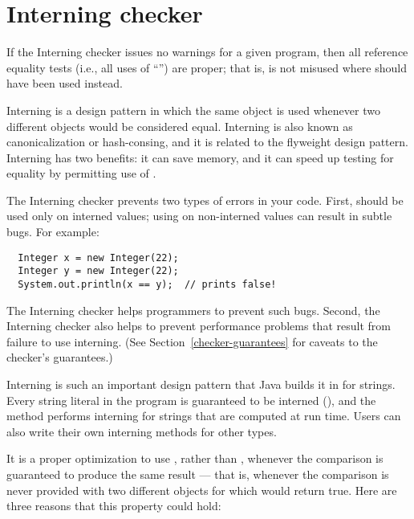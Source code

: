 \htmlhr
\chapter{Interning checker\label{interning-checker}}

If the Interning checker issues no warnings for a given program, then all
reference equality tests (i.e., all uses of ``\code{==}'') are proper;
that is,
\code{==} is not misused where  should have been used instead.

Interning is a design pattern in which the same object is used whenever two
different objects would be considered equal.  Interning is also known as
canonicalization or hash-consing, and it is related to the flyweight design
pattern.
Interning has two benefits:  it can save memory, and it can speed up testing for
equality by permitting use of \code{==}.

The Interning checker prevents two types of errors in your code.  First, 
\code{==} should be used
only on interned values; using \code{==} on
non-interned values can result in subtle bugs.  For example:

\begin{Verbatim}
  Integer x = new Integer(22);
  Integer y = new Integer(22);
  System.out.println(x == y);  // prints false!
\end{Verbatim}

\noindent
The Interning checker helps programmers to prevent such bugs.
Second, 
the Interning checker also helps to prevent performance problems that result
from failure to use interning.
(See Section~\ref{checker-guarantees} for caveats to the checker's guarantees.)

Interning is such an important design pattern that Java builds it in for
strings.  Every string literal in the program is guaranteed to be interned
(), and the
 method
performs interning for strings that are computed at run time.
Users can also write their own interning methods for other types.

It is a proper optimization to use \code{==}, rather than ,
whenever the comparison is guaranteed to produce the same result --- that
is, whenever the comparison is never provided with two different objects
for which  would return true.  Here are three reasons that
this property could hold:

